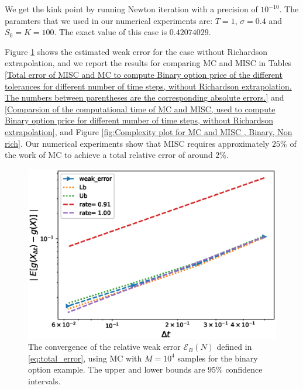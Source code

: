 We get the kink point by running Newton iteration with a precision of $10^{-10}$. The paramters that we used in our numerical experiments are: $T=1$, $\sigma=0.4$ and $S_0=K=100$. The exact value of this case is $0.42074029$.

Figure \ref{fig:Weak_rate_binary} shows the estimated   weak error  for the case without Richardson extrapolation, and we report the results for comparing MC and MISC in Tables \ref{Total error of MISC and MC to compute Binary option price of the different tolerances for different number of time steps, without Richardson extrapolation. The numbers between parentheses are the corresponding absolute errors.} and \ref{Comparsion of the computational time of  MC and MISC, used to compute Binary option price  for different number of time steps, without Richardson extrapolation}, and Figure \ref{fig:Complexity plot for MC and MISC , Binary, Non rich}. Our numerical experiments show that MISC  requires approximately $25\%$ of the work of MC  to achieve a total relative error of around $2\%$.

\FloatBarrier
\begin{figure}[h!]
		\centering
		\includegraphics[width=0.4\linewidth]{./figures/binary_weak_error/without_richardson/weak_convergence_order_binary_option_relative_M_10_4}
	
	\caption{The convergence of the relative weak error  $\mathcal{E}_B(N)$ defined in \ref{eq:total_error}, using MC with $M=10^4$ samples  for the binary option example. The upper and lower bounds are $95\%$ confidence intervals.}
	\label{fig:Weak_rate_binary}
\end{figure}


